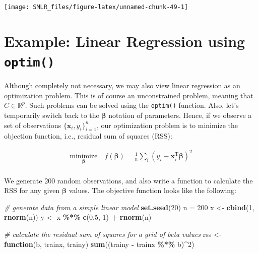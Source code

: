 \documentclass[
]{book}
\newenvironment{Shaded}{\begin{snugshade}}{\end{snugshade}}
\newcommand{\CommentTok}[1]{\textcolor[rgb]{0.56,0.35,0.01}{\textit{#1}}}
\newcommand{\ControlFlowTok}[1]{\textcolor[rgb]{0.13,0.29,0.53}{\textbf{#1}}}
\newcommand{\DecValTok}[1]{\textcolor[rgb]{0.00,0.00,0.81}{#1}}
\newcommand{\FloatTok}[1]{\textcolor[rgb]{0.00,0.00,0.81}{#1}}
\newcommand{\FunctionTok}[1]{\textcolor[rgb]{0.13,0.29,0.53}{\textbf{#1}}}
\newcommand{\NormalTok}[1]{#1}
\newcommand{\OtherTok}[1]{\textcolor[rgb]{0.56,0.35,0.01}{#1}}
\newcommand{\SpecialCharTok}[1]{\textcolor[rgb]{0.81,0.36,0.00}{\textbf{#1}}}
\theoremstyle{definition}
\theoremstyle{definition}
\theoremstyle{definition}
\theoremstyle{definition}
\theoremstyle{remark}
\begin{document}
\begin{center}\texttt{[image: SMLR\_files/figure-latex/unnamed-chunk-49-1]} \end{center}

\hypertarget{example-linear-regression-using-optim}{%
\section{\texorpdfstring{Example: Linear Regression using \texttt{optim()}}{Example: Linear Regression using optim()}}\label{example-linear-regression-using-optim}}

Although completely not necessary, we may also view linear regression as an optimization problem. This is of course an unconstrained problem, meaning that \(C \in \mathbb{R}^p\). Such problems can be solved using the \texttt{optim()} function. Also, let's temporarily switch back to the \(\boldsymbol \beta\) notation of parameters. Hence, if we observe a set of observations \(\{\mathbf{x}_i, y_i\}_{i = 1}^n\), our optimization problem is to minimize the objection function, i.e., residual sum of squares (RSS):

\begin{align}
\underset{\boldsymbol \beta}{\text{minimize}} \quad f(\boldsymbol \beta) = \frac{1}{n} \sum_i (y_i - \mathbf{x}_i^\text{T}\boldsymbol \beta)^2 \\
\end{align}

We generate 200 random observations, and also write a function to calculate the RSS for any given \(\boldsymbol \beta\) values. The objective function looks like the following:

\begin{Shaded}
\begin{Highlighting}[]
    \CommentTok{\# generate data from a simple linear model }
    \FunctionTok{set.seed}\NormalTok{(}\DecValTok{20}\NormalTok{)}
\NormalTok{    n }\OtherTok{=} \DecValTok{200}
\NormalTok{    x }\OtherTok{\textless{}{-}} \FunctionTok{cbind}\NormalTok{(}\DecValTok{1}\NormalTok{, }\FunctionTok{rnorm}\NormalTok{(n))}
\NormalTok{    y }\OtherTok{\textless{}{-}}\NormalTok{ x }\SpecialCharTok{\%*\%} \FunctionTok{c}\NormalTok{(}\FloatTok{0.5}\NormalTok{, }\DecValTok{1}\NormalTok{) }\SpecialCharTok{+} \FunctionTok{rnorm}\NormalTok{(n)}
    
    \CommentTok{\# calculate the residual sum of squares for a grid of beta values}
\NormalTok{    rss }\OtherTok{\textless{}{-}} \ControlFlowTok{function}\NormalTok{(b, trainx, trainy) }\FunctionTok{sum}\NormalTok{((trainy }\SpecialCharTok{{-}}\NormalTok{ trainx }\SpecialCharTok{\%*\%}\NormalTok{ b)}\SpecialCharTok{\^{}}\DecValTok{2}\NormalTok{)}
\end{Highlighting}
\end{Shaded}
\end{document}
